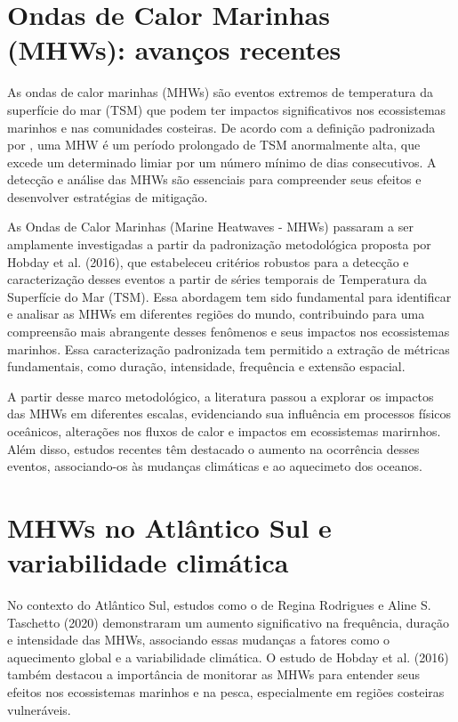 \section{Ondas de Calor Marinhas (MHWs): avanços recentes}\label{sec:ondas-de-calor-marinhas}

	As ondas de calor marinhas (MHWs) são eventos extremos de temperatura da superfície do mar (TSM) que podem ter impactos significativos nos ecossistemas marinhos e nas comunidades costeiras. De acordo com a definição padronizada por , uma MHW é um período prolongado de TSM anormalmente alta, que excede um determinado limiar por um número mínimo de dias consecutivos. A detecção e análise das MHWs são essenciais para compreender seus efeitos e desenvolver estratégias de mitigação.

	As Ondas de Calor Marinhas (Marine Heatwaves - MHWs) passaram a ser amplamente investigadas a partir da padronização metodológica proposta por Hobday et al. (2016), que estabeleceu critérios robustos para a detecção e caracterização desses eventos a partir de séries temporais de Temperatura da Superfície do Mar (TSM). Essa abordagem tem sido fundamental para identificar e analisar as MHWs em diferentes regiões do mundo, contribuindo para uma compreensão mais abrangente desses fenômenos e seus impactos nos ecossistemas marinhos.
	Essa caracterização padronizada tem permitido a extração de métricas fundamentais, como duração, intensidade, frequência e extensão espacial.

	A partir desse marco metodológico, a literatura passou a explorar os impactos das MHWs em diferentes escalas, evidenciando sua influência em processos físicos oceânicos, alterações nos fluxos de calor e impactos em ecossistemas marirnhos.
	Além disso, estudos recentes têm destacado o aumento na ocorrência desses eventos, associando-os às mudanças climáticas e ao aquecimeto dos oceanos.


\section{MHWs no Atlântico Sul e variabilidade climática}\label{sec:mhw-atlantico-sul}

	No contexto do Atlântico Sul, estudos como o de Regina Rodrigues e Aline S. Taschetto (2020) demonstraram um aumento significativo na frequência, duração e intensidade das MHWs, associando essas mudanças a fatores como o aquecimento global e a variabilidade climática. O estudo de Hobday et al. (2016) também destacou a importância de monitorar as MHWs para entender seus efeitos nos ecossistemas marinhos e na pesca, especialmente em regiões costeiras vulneráveis.
	
